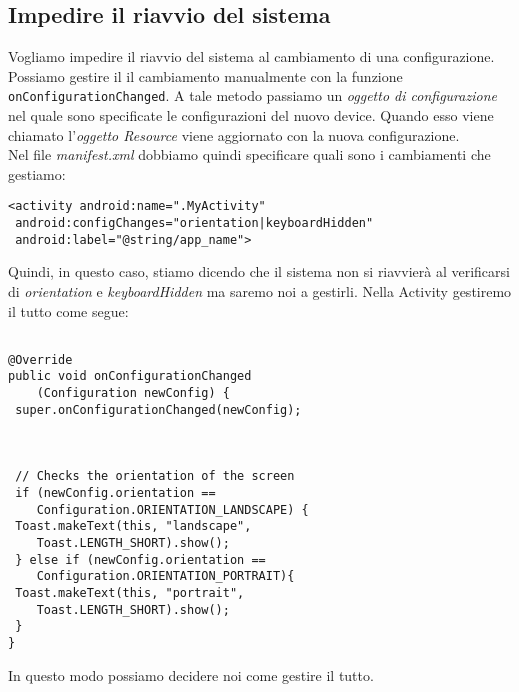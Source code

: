 \subsection{Impedire il riavvio del sistema}
Vogliamo impedire il riavvio del sistema al cambiamento di una configurazione.
Possiamo gestire il il cambiamento manualmente con la funzione 
\texttt{onConfigurationChanged}. A tale metodo passiamo un \textit{oggetto di
configurazione} nel quale sono specificate le configurazioni del nuovo device.
Quando esso viene chiamato l'\textit{oggetto Resource} viene aggiornato con la
nuova configurazione.\\
Nel file \textit{manifest.xml} dobbiamo quindi specificare quali sono i
cambiamenti che gestiamo:
\begin{lstlisting}[frame=single]  % Start your code-block
<activity android:name=".MyActivity"
 android:configChanges="orientation|keyboardHidden"
 android:label="@string/app_name">
\end{lstlisting}
Quindi, in questo caso, stiamo dicendo che il sistema non si riavvierà al
verificarsi di \textit{orientation} e \textit{keyboardHidden} ma saremo noi a
gestirli.
Nella Activity gestiremo il tutto come segue:

\begin{lstlisting}[frame=single]  % Start your code-block

@Override
public void onConfigurationChanged
    (Configuration newConfig) {
 super.onConfigurationChanged(newConfig);



 // Checks the orientation of the screen
 if (newConfig.orientation ==
    Configuration.ORIENTATION_LANDSCAPE) {
 Toast.makeText(this, "landscape",
    Toast.LENGTH_SHORT).show();
 } else if (newConfig.orientation ==
    Configuration.ORIENTATION_PORTRAIT){
 Toast.makeText(this, "portrait",
    Toast.LENGTH_SHORT).show();
 }
}
\end{lstlisting}
In questo modo possiamo decidere noi come gestire il tutto.


